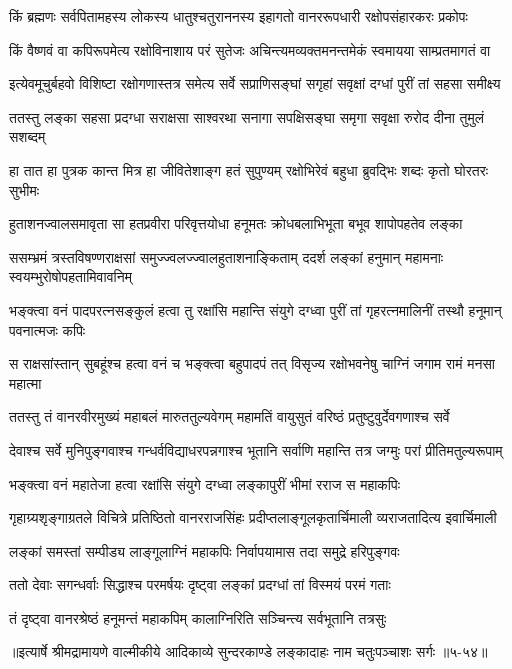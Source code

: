 \twolineshloka
{किं ब्रह्मणः सर्वपितामहस्य लोकस्य धातुश्चतुराननस्य}
{इहागतो वानररूपधारी रक्षोपसंहारकरः प्रकोपः} %

\twolineshloka
{किं वैष्णवं वा कपिरूपमेत्य रक्षोविनाशाय परं सुतेजः}
{अचिन्त्यमव्यक्तमनन्तमेकं स्वमायया साम्प्रतमागतं वा} %

\twolineshloka
{इत्येवमूचुर्बहवो विशिष्टा रक्षोगणास्तत्र समेत्य सर्वे}
{सप्राणिसङ्घां सगृहां सवृक्षां दग्धां पुरीं तां सहसा समीक्ष्य} %

\twolineshloka
{ततस्तु लङ्का सहसा प्रदग्धा सराक्षसा साश्वरथा सनागा}
{सपक्षिसङ्घा समृगा सवृक्षा रुरोद दीना तुमुलं सशब्दम्} %

\twolineshloka
{हा तात हा पुत्रक कान्त मित्र हा जीवितेशाङ्ग हतं सुपुण्यम्}
{रक्षोभिरेवं बहुधा ब्रुवद्भिः शब्दः कृतो घोरतरः सुभीमः} %

\twolineshloka
{हुताशनज्वालसमावृता सा हतप्रवीरा परिवृत्तयोधा}
{हनूमतः क्रोधबलाभिभूता बभूव शापोपहतेव लङ्का} %

\twolineshloka
{ससम्भ्रमं त्रस्तविषण्णराक्षसां समुज्ज्वलज्ज्वालहुताशनाङ्किताम्}
{ददर्श लङ्कां हनुमान् महामनाः स्वयम्भुरोषोपहतामिवावनिम्} %

\twolineshloka
{भङ्क्त्वा वनं पादपरत्नसङ्कुलं हत्वा तु रक्षांसि महान्ति संयुगे}
{दग्ध्वा पुरीं तां गृहरत्नमालिनीं तस्थौ हनूमान् पवनात्मजः कपिः} %

\twolineshloka
{स राक्षसांस्तान् सुबहूंश्च हत्वा वनं च भङ्क्त्वा बहुपादपं तत्}
{विसृज्य रक्षोभवनेषु चाग्निं जगाम रामं मनसा महात्मा} %

\twolineshloka
{ततस्तु तं वानरवीरमुख्यं महाबलं मारुततुल्यवेगम्}
{महामतिं वायुसुतं वरिष्ठं प्रतुष्टुवुर्देवगणाश्च सर्वे} %

\twolineshloka
{देवाश्च सर्वे मुनिपुङ्गवाश्च गन्धर्वविद्याधरपन्नगाश्च}
{भूतानि सर्वाणि महान्ति तत्र जग्मुः परां प्रीतिमतुल्यरूपाम्} %

\twolineshloka
{भङ्क्त्वा वनं महातेजा हत्वा रक्षांसि संयुगे}
{दग्ध्वा लङ्कापुरीं भीमां रराज स महाकपिः} %

\twolineshloka
{गृहाग्र्यशृङ्गाग्रतले विचित्रे प्रतिष्ठितो वानरराजसिंहः}
{प्रदीप्तलाङ्गूलकृतार्चिमाली व्यराजतादित्य इवार्चिमाली} %

\twolineshloka
{लङ्कां समस्तां सम्पीड्य लाङ्गूलाग्निं महाकपिः}
{निर्वापयामास तदा समुद्रे हरिपुङ्गवः} %

\twolineshloka
{ततो देवाः सगन्धर्वाः सिद्धाश्च परमर्षयः}
{दृष्ट्वा लङ्कां प्रदग्धां तां विस्मयं परमं गताः} %

\twolineshloka
{तं दृष्ट्वा वानरश्रेष्ठं हनूमन्तं महाकपिम्}
{कालाग्निरिति सञ्चिन्त्य सर्वभूतानि तत्रसुः} %


॥इत्यार्षे श्रीमद्रामायणे वाल्मीकीये आदिकाव्ये सुन्दरकाण्डे लङ्कादाहः नाम चतुःपञ्चाशः सर्गः ॥५-५४॥
